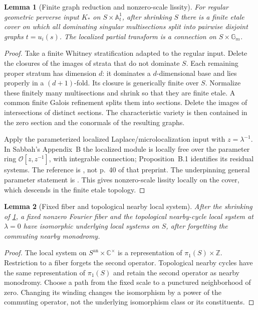 \documentclass[11pt]{article}
\numberwithin{equation}{section}
\newtheorem{lemma}[lemma]{Lemma}
\theoremstyle{definition}
\theoremstyle{remark}
\newcommand{\C}{\mathbb C}
\newcommand{\A}{\mathbb A}
\newcommand{\Gm}{\mathbb G_m}
\newcommand{\Ocal}{\mathcal O}
\begin{document}
\begin{lemma}[Finite graph reduction and nonzero-scale lissity]\label{lem:graphs}
For regular geometric perverse input $K_*$ on $S\times\A^1_t$, after
shrinking $S$ there is a finite etale cover on which all dominating
singular multisections split into pairwise disjoint graphs $t=u_i(s)$.
The localized partial transform is a connection on $S\times\Gm$.
\end{lemma}
\begin{proof}
Take a finite Whitney stratification adapted to the regular input. Delete
the closures of the images of strata that do not dominate $S$. Each
remaining proper stratum has dimension $d$: it dominates a $d$-dimensional
base and lies properly in a $(d+1)$-fold. Its closure is generically finite
over $S$. Normalize these finitely many multisections and shrink so that
they are finite etale. A common finite Galois refinement splits them into
sections. Delete the images of intersections of distinct sections. The
characteristic variety is then contained in the zero section and the
conormals of the resulting graphs.

Apply the parameterized localized Laplace/microlocalization input with
$z=\lambda^{-1}$. In Sabbah's Appendix~B the localized module is locally
free over the parameter ring $\Ocal[z,z^{-1}]$, with integrable
connection; Proposition~B.1 identifies its residual systems. The reference
is \cite[Appendix~B, preprint p.~12, immediately before Proposition~B.1]{SabbahParameters},
not p.~40 of that preprint. The underpinning general parameter statement is
\cite[Propositions~1.18 and~1.20]{DouaiSabbah}. This gives nonzero-scale
lissity locally on the cover, which descends in the finite etale topology.
\end{proof}

\begin{lemma}[Fixed fiber and topological nearby local system]
\label{lem:fiber-nearby}
After the shrinking of \cref{lem:graphs}, a fixed nonzero Fourier fiber
and the \emph{topological} nearby-cycle local system at $\lambda=0$
have isomorphic underlying local systems on $S$, after forgetting the
commuting nearby monodromy.
\end{lemma}
\begin{proof}
The local system on $S^{\mathrm{an}}\times\C^\times$ is a representation
of $\pi_1(S)\times\mathbb Z$. Restriction to a fiber forgets the second
operator. Topological nearby cycles have the same representation of
$\pi_1(S)$ and retain the second operator as nearby monodromy. Choose
a path from the fixed scale to a punctured neighborhood of zero. Changing
its winding changes the isomorphism by a power of the commuting operator,
not the underlying isomorphism class or its constituents.
\end{proof}
\end{document}
